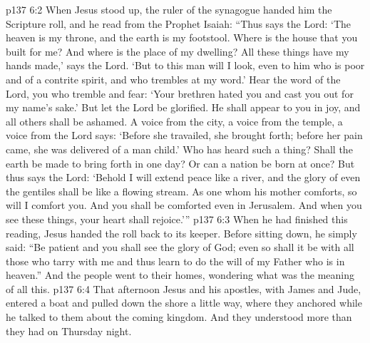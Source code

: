 \vs p137 6:2 When Jesus stood up, the ruler of the synagogue handed him the Scripture roll, and he read from the Prophet Isaiah: \textcolor{ubdarkred}{“Thus says the Lord: ‘The heaven is my throne, and the earth is my footstool. Where is the house that you built for me? And where is the place of my dwelling? All these things have my hands made,’ says the Lord. ‘But to this man will I look, even to him who is poor and of a contrite spirit, and who trembles at my word.’ Hear the word of the Lord, you who tremble and fear: ‘Your brethren hated you and cast you out for my name’s sake.’ But let the Lord be glorified. He shall appear to you in joy, and all others shall be ashamed. A voice from the city, a voice from the temple, a voice from the Lord says: ‘Before she travailed, she brought forth; before her pain came, she was delivered of a man child.’ Who has heard such a thing? Shall the earth be made to bring forth in one day? Or can a nation be born at once? But thus says the Lord: ‘Behold I will extend peace like a river, and the glory of even the gentiles shall be like a flowing stream. As one whom his mother comforts, so will I comfort you. And you shall be comforted even in Jerusalem. And when you see these things, your heart shall rejoice.’”}
\vs p137 6:3 When he had finished this reading, Jesus handed the roll back to its keeper. Before sitting down, he simply said: \textcolor{ubdarkred}{“Be patient and you shall see the glory of God; even so shall it be with all those who tarry with me and thus learn to do the will of my Father who is in heaven.”} And the people went to their homes, wondering what was the meaning of all this.
\pc \vs p137 6:4 That afternoon Jesus and his apostles, with James and Jude, entered a boat and pulled down the shore a little way, where they anchored while he talked to them about the coming kingdom. And they understood more than they had on Thursday night.
